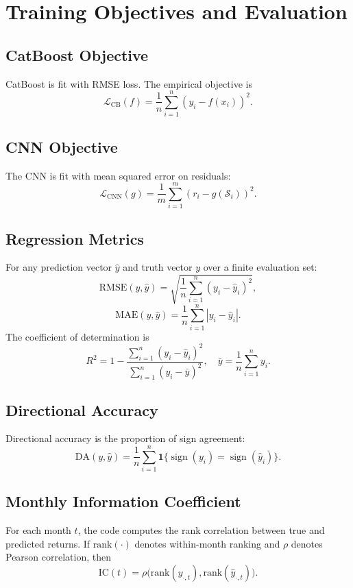 \documentclass[11pt]{article}
\newcommand{\1}{\mathbf{1}}
\newcommand{\loss}{\mathcal{L}}
\newcommand{\seq}{\mathcal{S}}
\begin{document}
\section{Training Objectives and Evaluation}

\subsection{CatBoost Objective}

CatBoost is fit with RMSE loss. The empirical objective is
\[
\loss_{\mathrm{CB}}(f) = \frac{1}{n} \sum_{i=1}^n (y_i - f(x_i))^2.
\]

\subsection{CNN Objective}

The CNN is fit with mean squared error on residuals:
\[
\loss_{\mathrm{CNN}}(g) = \frac{1}{m} \sum_{i=1}^m (r_i - g(\seq_i))^2.
\]

\subsection{Regression Metrics}

For any prediction vector $\hat y$ and truth vector $y$ over a finite evaluation set:
\[
\mathrm{RMSE}(y,\hat y) = \sqrt{\frac{1}{n} \sum_{i=1}^n (y_i - \hat y_i)^2},
\]
\[
\mathrm{MAE}(y,\hat y) = \frac{1}{n} \sum_{i=1}^n |y_i - \hat y_i|.
\]
The coefficient of determination is
\[
R^2 = 1 - \frac{\sum_{i=1}^n (y_i - \hat y_i)^2}{\sum_{i=1}^n (y_i - \bar y)^2},
\quad \bar y = \frac{1}{n}\sum_{i=1}^n y_i.
\]

\subsection{Directional Accuracy}

Directional accuracy is the proportion of sign agreement:
\[
\mathrm{DA}(y,\hat y) = \frac{1}{n} \sum_{i=1}^n \1\{\operatorname{sign}(y_i)=\operatorname{sign}(\hat y_i)\}.
\]

\subsection{Monthly Information Coefficient}

For each month $t$, the code computes the rank correlation between true and predicted returns. If $\mathrm{rank}(\cdot)$ denotes within-month ranking and $\rho$ denotes Pearson correlation, then
\[
\mathrm{IC}(t) = \rho\big(\mathrm{rank}(y_{\cdot,t}),\mathrm{rank}(\hat y_{\cdot,t})\big).
\]
\end{document}
